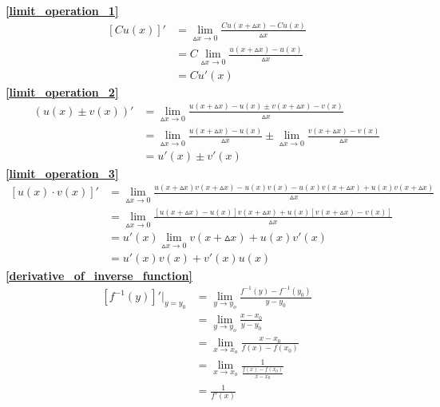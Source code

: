 \textbf{\large \ref{limit_operation_1}}
\begin{displaymath}
    \begin{split}
        \left[Cu(x)\right]'&=\lim\limits_{\vartriangle x\to 0}\frac{Cu(x+\vartriangle x)-Cu(x)}{\vartriangle x}\\
        &=C\lim\limits_{\vartriangle x\to 0}\frac{u(x+\vartriangle x)-u(x)}{\vartriangle x}\\
        &=Cu'(x)
    \end{split}
\end{displaymath}
\textbf{\large \ref{limit_operation_2}}
\begin{displaymath}
    \begin{split}
            (u(x)\pm v(x))'&=\lim\limits_{\vartriangle x\to 0}\frac{u(x+\vartriangle x)-u(x)\pm v(x+\vartriangle x)-v(x)}{\vartriangle x}\\
        &=\lim\limits_{\vartriangle x\to 0}\frac{u(x+\vartriangle x)-u(x)}{\vartriangle x}\pm\lim\limits_{\vartriangle x\to 0}\frac{v(x+\vartriangle x)-v(x)}{\vartriangle x}\\
        &=u'(x)\pm v'(x)
    \end{split}
\end{displaymath}
\textbf{\large \ref{limit_operation_3}}
\begin{displaymath}
    \begin{split}
        \left[u(x)\cdot v(x)\right]'&=\lim\limits_{\vartriangle x\to 0}\frac{u(x+\vartriangle x)v(x+\vartriangle x)-u(x)v(x)-u(x)v(x+\vartriangle x)+u(x)v(x+\vartriangle x)}{\vartriangle x}\\
            &=\lim\limits_{\vartriangle x\to 0}\frac{\left[u(x+\vartriangle x)-u(x)\right]v(x+\vartriangle x)+u(x)\left[v(x+\vartriangle x)-v(x)\right]}{\vartriangle x}\\
            &=u'(x)\lim\limits_{\vartriangle x\to 0}v(x+\vartriangle x)+u(x)v'(x)\\
            &=u'(x)v(x)+v'(x)u(x)
    \end{split}
\end{displaymath}
\textbf{\large \ref{derivative_of_inverse_function}}
\begin{displaymath}
    \begin{split}
        \left[f^{-1}(y)\right]'|_{y=y_0}&=\lim\limits_{y\to y_o}\frac{f^{-1}(y)-f^{-1}(y_0)}{y-y_0}\\
        &=\lim\limits_{y\to y_o}\frac{x-x_0}{y-y_0}\\
        &=\lim\limits_{x\to x_o}\frac{x-x_0}{f(x)-f(x_0)}\\
        &=\lim\limits_{x\to x_o}\frac{1}{\frac{f(x)-f(x_0)}{x-x_0}}\\
        &=\frac{1}{f'(x)}\\
    \end{split}
\end{displaymath}

